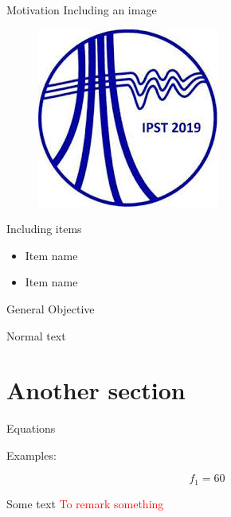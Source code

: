 \documentclass[10pt]{beamer}
\begin{document}
\begin{frame}[fragile]{Motivation}
Including an image

    \begin{figure}[ht]
      \hspace*{-1cm}\includegraphics[width=0.5\linewidth]{logoIPST2019}
    \end{figure}
\end{frame}
\begin{frame}[fragile]{Including items}
    \begin{itemize}
        \item Item name
\pause        
        \item Item name
    \end{itemize}
\end{frame}
\begin{frame}[fragile]{General Objective}
    
    Normal text
    
\end{frame}



\section{Another section}
\begin{frame}[fragile]{Equations}

Examples:

    \begin{equation}\label{eq:funtcionName}
        f_1 = 60
    \end{equation}

Some text
\pause
\textcolor{red}{To remark something}
\end{frame}
\end{document}
